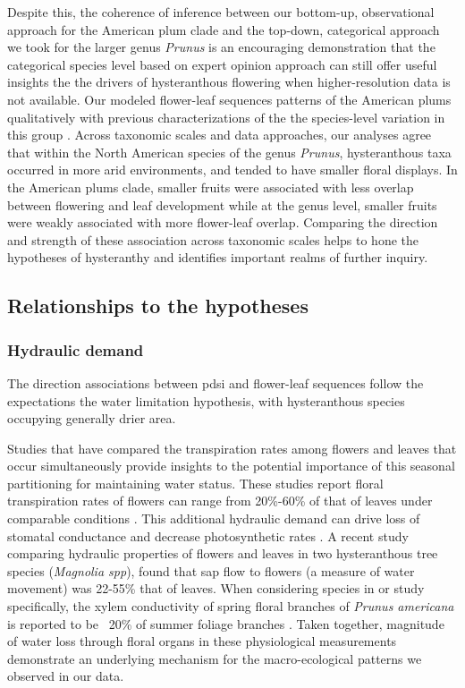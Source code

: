\documentclass{article}[11pt]
\begin{document}
Despite this, the coherence of inference between our bottom-up, observational approach for the American plum clade and the top-down, categorical approach we took for the larger genus \emph{Prunus} is an encouraging demonstration that the categorical species level based on expert opinion approach can still offer useful insights the the drivers of hysteranthous flowering when higher-resolution data is not available. Our modeled flower-leaf sequences patterns of the American plums qualitatively with previous characterizations of the the species-level variation in this group \citep{Shaw:2004aa}. Across taxonomic scales and data approaches, our analyses agree that within the North American species of the genus \emph{Prunus}, hysteranthous taxa occurred in more arid environments, and tended to have smaller floral displays. In the American plums clade, smaller fruits were associated with less overlap between flowering and leaf development while at the genus level, smaller fruits were weakly associated with more flower-leaf overlap.  Comparing the direction and strength of these association across taxonomic scales helps to hone the hypotheses of hysteranthy and identifies important realms of further inquiry.

\subsection*{Relationships to the hypotheses}
\subsubsection*{Hydraulic demand}
The direction associations between pdsi and flower-leaf sequences follow the expectations the water limitation hypothesis, with hysteranthous species occupying generally drier area. 

Studies that have compared the transpiration rates among flowers and leaves that occur simultaneously provide insights to the potential importance of this seasonal partitioning for maintaining water status. These studies report floral transpiration rates of flowers can range from 20\%-60\% of that of leaves under comparable conditions \citep{Whiley:1988uf,Roddy:2012wn}. This additional hydraulic demand can drive loss of stomatal conductance and  decrease photosynthetic rates \citep{Galen:1999vr}. A recent study \citet{Liu:2017wg} comparing hydraulic properties of flowers and leaves in two hysteranthous tree species (\textit{Magnolia spp}), found that sap flow to flowers (a measure of water movement) was 22-55\% that of leaves. When considering species in or study specifically, the xylem conductivity of spring floral branches of \textit{Prunus americana} is reported to be ~20\% of summer foliage branches \citep{McMann:2022ww}. Taken together, magnitude of water loss through floral organs in these physiological measurements demonstrate an underlying mechanism for the macro-ecological patterns we observed in our data.
\end{document}
